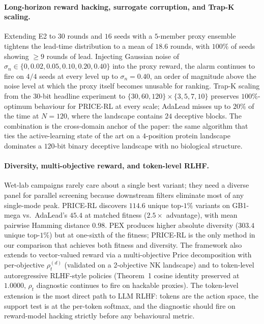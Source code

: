 \paragraph{Long-horizon reward hacking, surrogate corruption, and Trap-K scaling.} Extending E2 to $30$ rounds and $16$ seeds with a $5$-member proxy ensemble tightens the lead-time distribution to a mean of $18.6$ rounds, with $100\%$ of seeds showing $\geq 9$ rounds of lead. Injecting Gaussian noise of $\sigma_n \in \{0, 0.02, 0.05, 0.10, 0.20, 0.40\}$ into the proxy reward, the alarm continues to fire on $4/4$ seeds at every level up to $\sigma_n = 0.40$, an order of magnitude above the noise level at which the proxy itself becomes unusable for ranking. Trap-K scaling from the $30$-bit headline experiment to $\{30, 60, 120\}\times\{3,5,7,10\}$ preserves $100\%$-optimum behaviour for PRICE-RL at every scale; AdaLead misses up to $20\%$ of the time at $N=120$, where the landscape contains $24$ deceptive blocks. The combination is the cross-domain anchor of the paper: the same algorithm that ties the active-learning state of the art on a $4$-position protein landscape dominates a $120$-bit binary deceptive landscape with no biological structure.

\paragraph{Diversity, multi-objective reward, and token-level RLHF.} Wet-lab campaigns rarely care about a single best variant; they need a diverse panel for parallel screening because downstream filters eliminate most of any single-mode peak. PRICE-RL discovers $114.6$ unique top-$1\%$ variants on GB1-mega vs.\ AdaLead's $45.4$ at matched fitness ($2.5\times$ advantage), with mean pairwise Hamming distance $0.98$. PEX produces higher absolute diversity ($303.4$ unique top-$1\%$) but at one-sixth of the fitness; PRICE-RL is the only method in our comparison that achieves both fitness and diversity. The framework also extends to vector-valued reward via a multi-objective Price decomposition with per-objective $\rho^{(d)}_t$ (validated on a 2-objective NK landscape) and to token-level autoregressive RLHF-style policies (Theorem~1 cosine identity preserved at $1.0000$, $\rho_t$ diagnostic continues to fire on hackable proxies). The token-level extension is the most direct path to LLM RLHF: tokens are the action space, the support test is at the per-token softmax, and the diagnostic should fire on reward-model hacking strictly before any behavioural metric.

